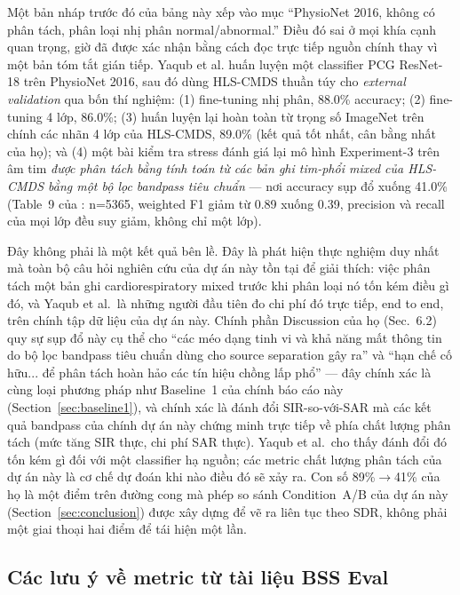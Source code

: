 \documentclass[11pt]{article}
\begin{document}
Một bản nháp trước đó của bảng này xếp \cite{spectrotemporal} vào mục
``PhysioNet 2016, không có phân tách, phân loại nhị phân normal/abnormal.''
Điều đó sai ở mọi khía cạnh quan trọng, giờ đã được xác nhận bằng cách
đọc trực tiếp nguồn chính thay vì một bản tóm tắt gián tiếp. Yaqub et al.
huấn luyện một classifier PCG ResNet-18 trên PhysioNet 2016, sau đó dùng
HLS-CMDS thuần túy cho \emph{external validation} qua bốn thí nghiệm:
(1) fine-tuning nhị phân, 88.0\% accuracy; (2) fine-tuning 4 lớp, 86.0\%;
(3) huấn luyện lại hoàn toàn từ trọng số ImageNet trên chính các nhãn 4
lớp của HLS-CMDS, 89.0\% (kết quả tốt nhất, cân bằng nhất của họ); và
(4) một bài kiểm tra stress đánh giá lại mô hình Experiment-3 trên âm
tim \emph{được phân tách bằng tính toán từ các bản ghi tim-phổi mixed
của HLS-CMDS bằng một bộ lọc bandpass tiêu chuẩn} --- nơi accuracy sụp
đổ xuống 41.0\% (Table~9 của \cite{spectrotemporal}: n=5365, weighted F1
giảm từ 0.89 xuống 0.39, precision và recall của mọi lớp đều suy giảm,
không chỉ một lớp).

Đây không phải là một kết quả bên lề. Đây là phát hiện thực nghiệm duy
nhất mà toàn bộ câu hỏi nghiên cứu của dự án này tồn tại để giải thích:
việc phân tách một bản ghi cardiorespiratory mixed trước khi phân loại
nó tốn kém điều gì đó, và Yaqub et al.\ là những người đầu tiên đo chi
phí đó trực tiếp, end to end, trên chính tập dữ liệu của dự án này.
Chính phần Discussion của họ (Sec.~6.2) quy sự sụp đổ này cụ thể cho
``các méo dạng tinh vi và khả năng mất thông tin do bộ lọc bandpass
tiêu chuẩn dùng cho source separation gây ra'' và ``hạn chế cố hữu... để
phân tách hoàn hảo các tín hiệu chồng lấp phổ'' --- đây chính xác là
cùng loại phương pháp như Baseline~1 của chính báo cáo này
(Section~\ref{sec:baseline1}), và chính xác là đánh đổi
SIR-so-với-SAR mà các kết quả bandpass của chính dự án này chứng minh
trực tiếp về phía chất lượng phân tách (mức tăng SIR thực, chi phí SAR
thực). Yaqub et al.\ cho thấy đánh đổi đó tốn kém gì đối với một
classifier hạ nguồn; các metric chất lượng phân tách của dự án này là cơ
chế dự đoán khi nào điều đó sẽ xảy ra. Con số 89\%$\to$41\% của họ là
một điểm trên đường cong mà phép so sánh Condition~A/B của dự án này
(Section~\ref{sec:conclusion}) được xây dựng để vẽ ra liên tục theo SDR,
không phải một giai thoại hai điểm để tái hiện một lần.

\subsection{Các lưu ý về metric từ tài liệu BSS Eval}
\label{sec:relatedmetrics}
\end{document}
